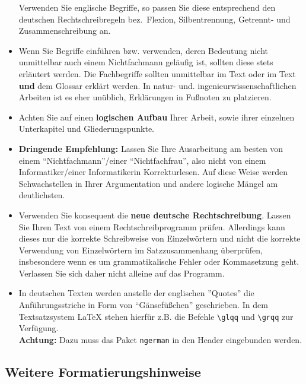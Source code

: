 \begin{itemize}
Verwenden Sie englische Begriffe, so passen Sie diese entsprechend den deutschen Rechtschreibregeln bez.~Flexion, Silbentrennung, Getrennt- und Zusammenschreibung an.
\item Wenn Sie Begriffe einführen bzw. verwenden, deren Bedeutung nicht unmittelbar auch einem Nichtfachmann geläufig ist, sollten diese stets erläutert werden. 
Die Fachbegriffe sollten unmittelbar im Text oder im Text {\bf und} dem Glossar erklärt werden. 
In natur- und. ingenieurwissenschaftlichen Arbeiten ist es eher unüblich, Erklärungen in Fußnoten zu platzieren. 
\item Achten Sie auf einen {\bf logischen Aufbau} Ihrer Arbeit, sowie ihrer einzelnen Unterkapitel und Gliederungspunkte.
\item {\bf Dringende Empfehlung:} Lassen Sie Ihre Ausarbeitung am besten von einem "`Nichtfachmann"'/einer "`Nichtfachfrau"', also nicht von einem Informatiker/einer Informatikerin Korrekturlesen.
Auf diese Weise werden Schwachstellen in Ihrer Argumentation und andere logische Mängel am deutlichsten.
\item Verwenden Sie konsequent die {\bf neue deutsche Rechtschreibung}.
Lassen Sie Ihren Text von einem Rechtschreibprogramm prüfen.
Allerdings kann dieses nur die korrekte Schreibweise von Einzelwörtern und nicht die korrekte Verwendung von Einzelwörtern im Satzzusammenhang überprüfen, insbesondere wenn es um grammatikalische Fehler oder Kommasetzung geht.
Verlassen Sie sich daher nicht alleine auf das Programm.
\item In deutschen Texten werden anstelle der englischen ''Quotes'' die Anführungsstriche in Form von "`Gänsefüßchen"' geschrieben. 
In dem Textsatzsystem {\LaTeX} stehen hierfür z.B. die Befehle \verb|\glqq| und \verb|\grqq| zur Verfügung. \\
{\bf Achtung:} Dazu muss das Paket {\tt ngerman} in den Header eingebunden werden.
\end{itemize}



\subsection{Weitere Formatierungshinweise}
